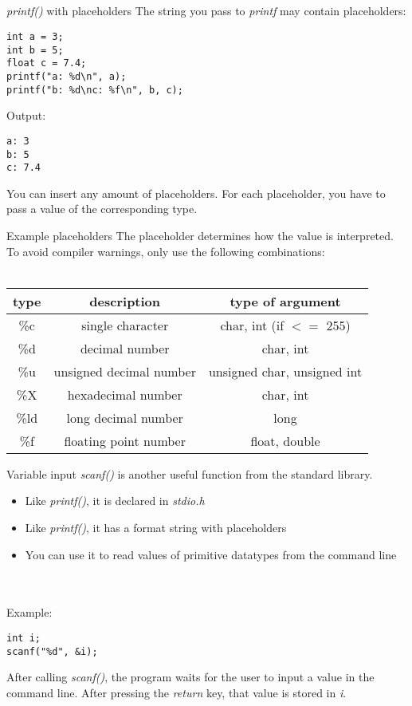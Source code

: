 \subsection{}
\begin{frame}[fragile]{\textit{printf()} with placeholders}
	The string you pass to \textit{printf} may contain placeholders:
	\begin{lstlisting}[numbers=none]
int a = 3;
int b = 5;
float c = 7.4;
printf("a: %d\n", a);
printf("b: %d\nc: %f\n", b, c);
\end{lstlisting}
Output:\begin{lstlisting}[numbers=none]
a: 3
b: 5
c: 7.4
\end{lstlisting}
You can insert any amount of placeholders. For each placeholder, you have to pass a value of the corresponding type.
\end{frame}
\begin{frame}{Example placeholders}
	The placeholder determines how the value is interpreted.
	To avoid compiler warnings, only use the following combinations: \\ \ \\
	\begin{tabular}{|c|c|c|}
		\hline
		\textbf{type} & \textbf{description} & \textbf{type of argument} \\\hline
		\%c & single character & char, int (if $<=$ 255) \\\hline
		\%d & decimal number & char, int \\\hline
		\%u & unsigned decimal number & unsigned char, unsigned int \\\hline
		\%X & hexadecimal number & char, int \\\hline
		\%ld & long decimal number & long \\\hline
		\%f & floating point number & float, double \\\hline
	\end{tabular}
\end{frame}
\begin{frame}[fragile]{Variable input}
	\textit{scanf()} is another useful function from the standard library.
	\begin{itemize}
		\item Like \textit{printf()}, it is declared in \textit{stdio.h}
		\item Like \textit{printf()}, it has a format string with placeholders
		\item You can use it to read values of primitive datatypes from the command line
	\end{itemize}
	\ \\ \ \\ Example:
	\begin{lstlisting}[numbers=none]
int i;
scanf("%d", &i);	
\end{lstlisting}
	After calling \textit{scanf()}, the program waits for the user to input a value in the command line.
	After pressing the \textit{return} key, that value is stored in \textit{i}.
\end{frame}
